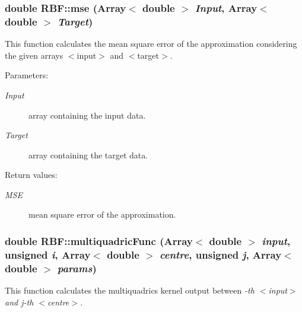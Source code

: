 \subsubsection{\setlength{\rightskip}{0pt plus 5cm}double RBF::mse (Array$<$ double $>$ {\em Input}, Array$<$ double $>$ {\em Target})}\label{classRBF_a9}


This function calculates the mean square error of the approximation considering the given arrays $<$input$>$ and $<$target$>$. 

\begin{Desc}
\item[Parameters:]
\begin{description}
\item[{\em Input}]array containing the input data. \item[{\em Target}]array containing the target data. \end{description}
\end{Desc}
\begin{Desc}
\item[Return values:]
\begin{description}
\item[{\em MSE}]mean square error of the approximation.\end{description}
\end{Desc}
\subsubsection{\setlength{\rightskip}{0pt plus 5cm}double RBF::multiquadric\-Func (Array$<$ double $>$ {\em input}, unsigned {\em i}, Array$<$ double $>$ {\em centre}, unsigned {\em j}, Array$<$ double $>$ {\em params})\hspace{0.3cm}{\tt  [static]}}\label{classRBF_e4}


This function calculates the multiquadrics kernel output between {\em -th $<$input$>$ and j-th $<$centre$>$. \/}

